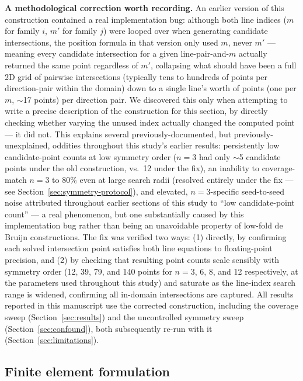 \documentclass[11pt]{article}
\begin{document}
\textbf{A methodological correction worth recording.} An earlier version of this construction contained a real implementation bug: although both line indices ($m$ for family $i$, $m'$ for family $j$) were looped over when generating candidate intersections, the position formula in that version only used $m$, never $m'$ --- meaning every candidate intersection for a given line-pair-and-$m$ actually returned the same point regardless of $m'$, collapsing what should have been a full 2D grid of pairwise intersections (typically tens to hundreds of points per direction-pair within the domain) down to a single line's worth of points (one per $m$, $\sim$17 points) per direction pair. We discovered this only when attempting to write a precise description of the construction for this section, by directly checking whether varying the unused index actually changed the computed point --- it did not. This explains several previously-documented, but previously-unexplained, oddities throughout this study's earlier results: persistently low candidate-point counts at low symmetry order ($n=3$ had only $\sim$5 candidate points under the old construction, vs.\ 12 under the fix), an inability to coverage-match $n=3$ to 80\% even at large search radii (resolved entirely under the fix --- see Section~\ref{sec:symmetry-protocol}), and elevated, $n=3$-specific seed-to-seed noise attributed throughout earlier sections of this study to ``low candidate-point count'' --- a real phenomenon, but one substantially caused by this implementation bug rather than being an unavoidable property of low-fold de Bruijn constructions. The fix was verified two ways: (1) directly, by confirming each solved intersection point satisfies both line equations to floating-point precision, and (2) by checking that resulting point counts scale sensibly with symmetry order (12, 39, 79, and 140 points for $n=3$, 6, 8, and 12 respectively, at the parameters used throughout this study) and saturate as the line-index search range is widened, confirming all in-domain intersections are captured. All results reported in this manuscript use the corrected construction, including the coverage sweep (Section~\ref{sec:results}) and the uncontrolled symmetry sweep (Section~\ref{sec:confound}), both subsequently re-run with it (Section~\ref{sec:limitations}).

\subsection{Finite element formulation}
\label{sec:methods-element}
\end{document}
